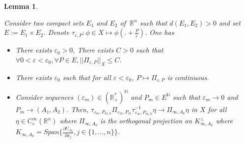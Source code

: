 \documentclass[12pt]{amsart}
\theoremstyle{plain}
\newtheorem{lemma}[theorem]{Lemma}       %
\theoremstyle{definition}
\theoremstyle{remark}
\renewcommand{\epsilon}{\varepsilon}
\begin{document}
\medskip
\begin{lemma}\label{Projection prop}

Consider two compact sets $E_1$ and $E_2$  of $~\mathbb{R}^{n}$ such that $d(E_1,E_2)>0$ and set $E:=E_1\times E_2$. 
Denote $\tau_{\epsilon,P}:\phi \in X \mapsto \phi(. +\frac{P}{\epsilon}) $. One has
\begin{itemize}
    \item There exists $\epsilon_0 >0$, There exists $C>0$ such that $\forall 0<\epsilon <\epsilon_0,\forall P\in E, ||\Pi_{\epsilon,P}||_X\leq C$. 
    
    \item There exists $\epsilon_0$ such that for all $\epsilon <\epsilon_0$, $P \mapsto \Pi_{\epsilon,P}$ is continuous.
    \item Consider sequences $(\epsilon_m)\in (\mathbb{R}_+^*)^\mathbb{N}$ and $P_m \in E^\mathbb{N}$ such that $\epsilon_m \rightarrow 0$ and $P_m \rightarrow (A_1,A_2)$. Then, $\tau_{\epsilon_m,P_{m,k}}\Pi_{\epsilon_m,P_m}\tau_{\epsilon_m,P_{m,k}}^{-1} \eta \rightarrow \Pi_{\infty,A_k}\eta$ in $X$ for all  $\eta \in C_c^\infty(\mathbb{R}^n)$ where $\Pi_{\infty,A_k}$ is the orthogonal projection on $ K_{\infty,A_k}^{\perp}$ where  $K_{\infty,A_k}=Span\{\frac{\partial U_{A_k}}{\partial x_j},j\in\{1,...,n\}\}$.
    \end{itemize}



\end{lemma}
\end{document}
